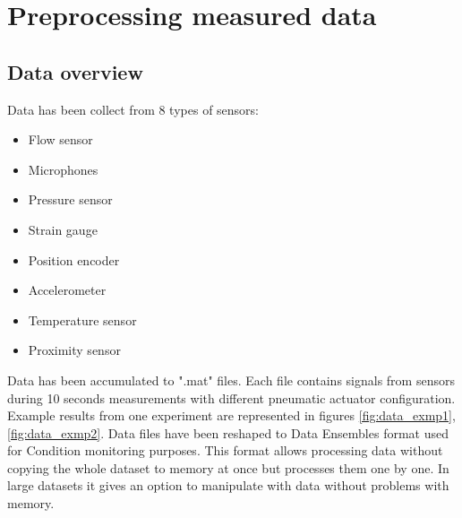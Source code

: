 \documentclass[class=article, crop=false]{standalone}
\begin{document}
\section{Preprocessing measured data}

\subsection{Data overview}

Data has been collect from 8 types of sensors:

\begin{itemize}
\item Flow sensor
\item Microphones
\item Pressure sensor
\item Strain gauge
\item Position encoder
\item Accelerometer
\item Temperature sensor
\item Proximity sensor
\end{itemize}

Data has been accumulated to ".mat" files.
Each file contains signals from sensors during 10 seconds measurements with
different pneumatic actuator configuration. Example results from one
experiment are represented in figures \ref{fig:data_exmp1},
\ref{fig:data_exmp2}. Data files have been reshaped
to Data Ensembles format used for Condition monitoring purposes. This
format allows processing data without copying the whole dataset to
memory at once but processes them one by one. In large datasets it gives an
option to manipulate with data without problems with memory.
\end{document}
